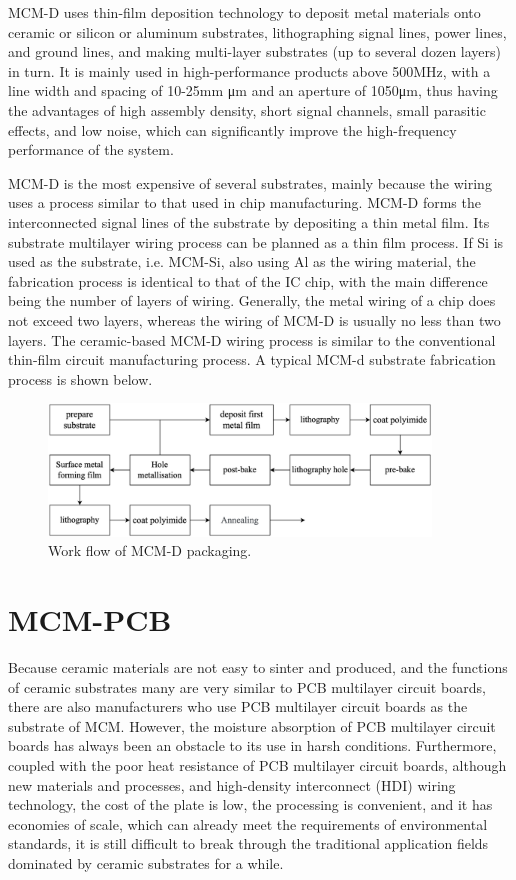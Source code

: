 \begin{spacing}{1.5}
MCM-D uses thin-film deposition technology to deposit metal materials onto ceramic or silicon or aluminum substrates, lithographing signal lines, power lines, and ground lines, and making multi-layer substrates (up to several dozen layers) in turn. It is mainly used in high-performance products above 500MHz, with a line width and spacing of 10-25mm μm and an aperture of 1050μm, thus having the advantages of high assembly density, short signal channels, small parasitic effects, and low noise, which can significantly improve the high-frequency performance of the system.

MCM-D is the most expensive of several substrates, mainly because the wiring uses a process similar to that used in chip manufacturing. MCM-D forms the interconnected signal lines of the substrate by depositing a thin metal film. Its substrate multilayer wiring process can be planned as a thin film process. If Si is used as the substrate, i.e. MCM-Si, also using Al as the wiring material, the fabrication process is identical to that of the IC chip, with the main difference being the number of layers of wiring. Generally, the metal wiring of a chip does not exceed two layers, whereas the wiring of MCM-D is usually no less than two layers. The ceramic-based MCM-D wiring process is similar to the conventional thin-film circuit manufacturing process. A typical MCM-d substrate fabrication process is shown below.

\begin{figure}[ht]
	\centering
	\includegraphics[width=4in, fbox]{Chapter3/4.eps}
	\caption{Work flow of MCM-D packaging.}
	\label{fig:chpt3.4} 
\end{figure}

\section{MCM-PCB}

Because ceramic materials are not easy to sinter and produced, and the functions of ceramic substrates many are very similar to PCB multilayer circuit boards, there are also manufacturers who use PCB multilayer circuit boards as the substrate of MCM. However, the moisture absorption of PCB multilayer circuit boards has always been an obstacle to its use in harsh conditions. Furthermore, coupled with the poor heat resistance of PCB multilayer circuit boards, although new materials and processes, and high-density interconnect (HDI) wiring technology, the cost of the plate is low, the processing is convenient, and it has economies of scale, which can already meet the requirements of environmental standards, it is still difficult to break through the traditional application fields dominated by ceramic substrates for a while.

\end{spacing}
\newpage
